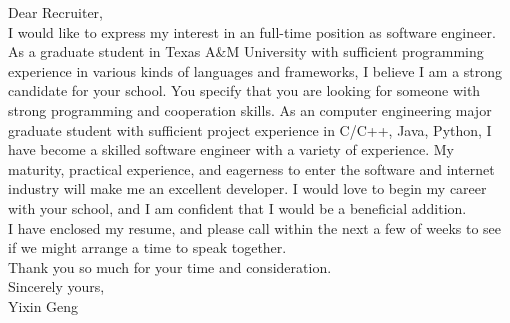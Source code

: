 \documentclass[12pt]{article}
\begin{document}
Dear Recruiter,\\

I would like to express my interest in an full-time position as software engineer.
As a graduate student in Texas A\&M University with sufficient programming experience in
various kinds of languages and frameworks, I believe I am a strong candidate for your school.
You specify that you are looking for someone with strong programming and cooperation skills.
As an computer engineering major graduate student with sufficient project experience in
C/C++, Java, Python, I have become a skilled software engineer with a variety of experience.
My maturity, practical experience, and eagerness to enter the software and internet industry
will make me an excellent developer. I would love to begin my career with your school, and
I am confident that I would be a beneficial addition.\\

I have enclosed my resume, and please call within the next a few of weeks to see if we might
arrange a time to speak together.\\

Thank you so much for your time and consideration.\\

Sincerely yours,\\

Yixin Geng
\end{document}
